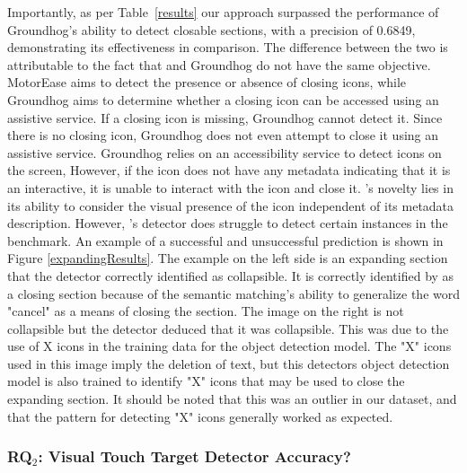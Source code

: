 Importantly, as per Table~\ref{results} our approach surpassed the performance of Groundhog's ability to detect closable sections, with a precision of 0.6849, demonstrating its effectiveness in comparison. The difference between the two is attributable to the fact that \MotorEase and Groundhog do not have the same objective. MotorEase aims to detect the presence or absence of closing icons, while Groundhog aims to determine whether a closing icon can be accessed using an assistive service. If a closing icon is missing, Groundhog cannot detect it. Since there is no closing icon, Groundhog does not even attempt to close it using an assistive service. Groundhog relies on an accessibility service to detect icons on the screen, However, if the icon does not have any metadata indicating that it is an interactive, it is unable to interact with the icon and close it. \MotorEase's novelty lies in its ability to consider the visual presence of the icon independent of its metadata description. However, \MotorEase's detector does struggle to detect certain instances in the \MotorEase benchmark. An example of a successful and unsuccessful prediction is shown in Figure \ref{expandingResults}. The example on the left side is an expanding section that the detector correctly identified as collapsible. It is correctly identified by \MotorEase as a closing section because of the semantic matching's ability to generalize the word "cancel" as a means of closing the section. The image on the right is not collapsible but the detector deduced that it was collapsible. This was due to the use of X icons in the training data for the object detection model. The "X" icons used in this image imply the deletion of text, but this detectors object detection model is also trained to identify "X" icons that may be used to close the expanding section. It should be noted that this was an outlier in our dataset, and that the pattern for detecting "X" icons generally worked as expected.

\subsubsection{RQ$_2$: Visual Touch Target Detector Accuracy?}
 

